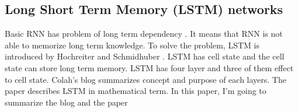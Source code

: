 \documentclass[prodmode,acmtecs]{acmsmall} %
\begin{document}
\subsection{Long Short Term Memory (LSTM) networks}
Basic RNN has problem of long term dependency \cite{UnderstandingLSTMNetworks}. It means that RNN is not able to memorize long term knowledge. To solve the problem, LSTM is introduced by Hochreiter and Schmidhuber \cite{hochreiter1997long}. LSTM has cell state and the cell state can store long term memory. LSTM has four layer and three of them effect to cell state. Colah's blog \cite{UnderstandingLSTMNetworks} summarizes concept and purpose of each layers. The paper \cite{zaremba2014recurrent} describes LSTM in mathematical term. In this paper, I'm going to summarize the blog \cite{UnderstandingLSTMNetworks} and the paper \cite{zaremba2014recurrent}
\end{document}
